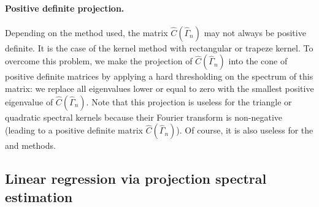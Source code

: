 \paragraph{Positive definite projection.} 
Depending on the method used, the matrix $\widehat{C} (\widehat{\Gamma}_{n})$ may not always be positive definite. It is the case of the kernel method with rectangular or trapeze kernel. To overcome this problem, we make the  projection of $\widehat{C} (\widehat{\Gamma}_{n})$ into the cone of positive definite matrices by applying a hard thresholding on the spectrum of this matrix: we replace all eigenvalues lower or equal to zero with the smallest positive eigenvalue of $\widehat{C} (\widehat{\Gamma}_{n})$.
Note that this projection is useless for the triangle or quadratic spectral kernels because their Fourier transform is non-negative (leading to a positive definite matrix  $\widehat{C} (\widehat{\Gamma}_{n})$). Of course, it is also useless for the  and  methods. 

\subsection{Linear regression via projection spectral estimation}

